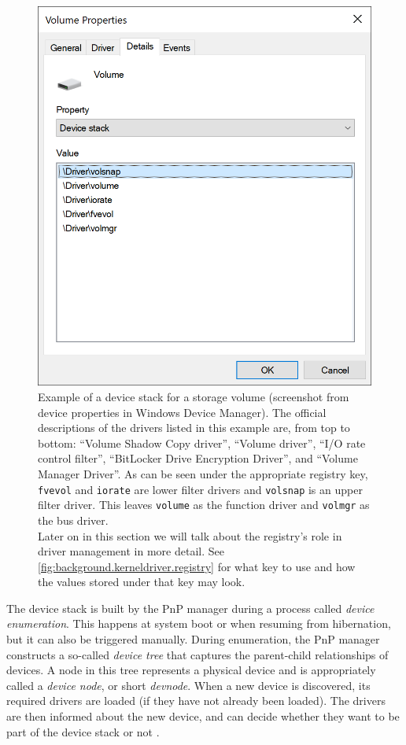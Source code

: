\begin{figure}[htb!]
	\center
	\includegraphics[scale=0.7]{../img/background.kerneldriver.devicestack.png}
	\caption[
		Example of a device stack for a storage volume
	]{
		Example of a device stack for a storage volume (screenshot from device properties in Windows Device Manager). The official descriptions of the drivers listed in this example are, from top to bottom: ``Volume Shadow Copy driver'', ``Volume driver'', ``I/O rate control filter'', ``BitLocker Drive Encryption Driver'', and ``Volume Manager Driver''. As can be seen under the appropriate registry key, \texttt{fvevol} and \texttt{iorate} are lower filter drivers and \texttt{volsnap} is an upper filter driver. This leaves \texttt{volume} as the function driver and \texttt{volmgr} as the bus driver.\\
		Later on in this section we will talk about the registry's role in driver management in more detail. See \autoref{fig:background.kerneldriver.registry} for what key to use and how the values stored under that key may look.
	}
	\label{fig:background.kerneldriver.devicestack}
\end{figure}

The device stack is built by the PnP manager during a process called \emph{device enumeration}. This happens at system boot or when resuming from hibernation, but it can also be triggered manually. During enumeration, the PnP manager constructs a so-called \emph{device tree} that captures the parent-child relationships of devices. A node in this tree represents a physical device and is appropriately called a \emph{device node}, or short \emph{devnode}. When a new device is discovered, its required drivers are loaded (if they have not already been loaded). The drivers are then informed about the new device, and can decide whether they want to be part of the device stack or not \cite{Yosifovich2017}.

